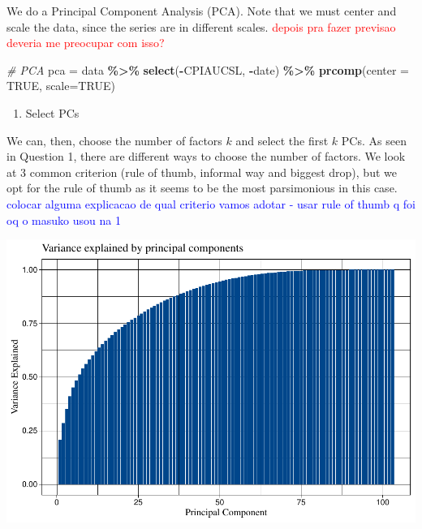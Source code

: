 \documentclass[
]{article}
\newenvironment{Shaded}{\begin{snugshade}}{\end{snugshade}}
\newcommand{\AttributeTok}[1]{\textcolor[rgb]{0.13,0.29,0.53}{#1}}
\newcommand{\CommentTok}[1]{\textcolor[rgb]{0.56,0.35,0.01}{\textit{#1}}}
\newcommand{\ConstantTok}[1]{\textcolor[rgb]{0.56,0.35,0.01}{#1}}
\newcommand{\FunctionTok}[1]{\textcolor[rgb]{0.13,0.29,0.53}{\textbf{#1}}}
\newcommand{\NormalTok}[1]{#1}
\newcommand{\OtherTok}[1]{\textcolor[rgb]{0.56,0.35,0.01}{#1}}
\newcommand{\SpecialCharTok}[1]{\textcolor[rgb]{0.81,0.36,0.00}{\textbf{#1}}}
\providecommand{\tightlist}{%
  \setlength{\itemsep}{0pt}\setlength{\parskip}{0pt}}
\begin{document}
We do a Principal Component Analysis (PCA). Note that we must center and
scale the data, since the series are in different scales.
\textcolor{red}{depois pra fazer previsao deveria me preocupar com isso?}

\begin{Shaded}
\begin{Highlighting}[]
\CommentTok{\# PCA}
\NormalTok{pca }\OtherTok{=}\NormalTok{ data }\SpecialCharTok{\%\textgreater{}\%} 
  \FunctionTok{select}\NormalTok{(}\SpecialCharTok{{-}}\NormalTok{CPIAUCSL, }\SpecialCharTok{{-}}\NormalTok{date) }\SpecialCharTok{\%\textgreater{}\%} 
  \FunctionTok{prcomp}\NormalTok{(}\AttributeTok{center =} \ConstantTok{TRUE}\NormalTok{, }\AttributeTok{scale=}\ConstantTok{TRUE}\NormalTok{)  }
\end{Highlighting}
\end{Shaded}

\begin{enumerate}
\def\labelenumi{\arabic{enumi}.}
\setcounter{enumi}{1}
\tightlist
\item
  Select PCs
\end{enumerate}

We can, then, choose the number of factors \(k\) and select the first
\(k\) PCs. As seen in Question 1, there are different ways to choose the
number of factors. We look at 3 common criterion (rule of thumb,
informal way and biggest drop), but we opt for the rule of thumb as it
seems to be the most parsimonious in this case.
\textcolor{blue}{colocar alguma explicacao de qual criterio vamos adotar - usar rule of thumb q foi oq o masuko usou na 1}

\includegraphics{Trabalho_Econo4_Q2_files/figure-latex/unnamed-chunk-11-1.pdf}
\end{document}
